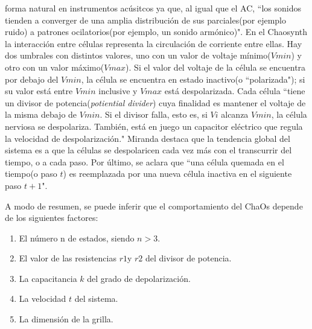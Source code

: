 \documentclass[16pt,spanish]{article}
\begin{document}
forma natural en instrumentos acúsitcos ya que, al igual que el AC, ``los
sonidos tienden a converger de una amplia distribución de sus parciales(por
ejemplo ruido) a patrones ocilatorios(por ejemplo, un sonido armónico)". En el
Chaosynth la interacción entre células representa la circulación de corriente
entre ellas. Hay dos umbrales con distintos valores, uno con un valor de
voltaje mínimo(\(Vmin\)) y otro con un valor máximo(\(Vmax\)). Si el valor del voltaje
de la célula se encuentra por debajo del \(Vmin\), la célula se encuentra en estado
inactivo(o ``polarizada"); si su valor está entre \(Vmin\) inclusive y \(Vmax\) está
despolarizada. Cada célula ``tiene un divisor de potencia(\textit{potiential
divider}) cuya finalidad es mantener el voltaje de la misma debajo de \(Vmin\). Si
el divisor falla, esto es, si \(Vi\) alcanza \(Vmin\), la célula nerviosa se
despolariza. También, está en juego un capacitor eléctrico que regula la
velocidad de despolarización." Miranda destaca que la tendencia global del
sistema es a que la células se despolaricen cada vez más con el transcurrir del
tiempo, o a cada paso. Por último, se aclara que ``una célula quemada en el
tiempo(o paso \(t\)) es reemplazada por una nueva célula inactiva en el siguiente
paso \(t+1\)".

A modo de resumen, se puede inferir que el comportamiento del ChaOs depende de los siguientes factores:

\begin{enumerate}
	\item El número n de estados, siendo \(n > 3\).
	\item El valor de las resistencias \(r1\)y \(r2\) del divisor de potencia.
	\item La capacitancia \(k\) del grado de depolarización.
	\item La velocidad \(t\) del sistema.
	\item La dimensión de la grilla.
\end{enumerate}
\end{document}
